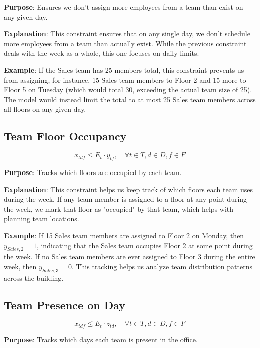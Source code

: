 \documentclass[12pt,a4paper]{article}
\begin{document}
\textbf{Purpose}: Ensures we don't assign more employees from a team than exist on any given day.

\textbf{Explanation}: This constraint ensures that on any single day, we don't schedule more employees from a team than actually exist. While the previous constraint deals with the week as a whole, this one focuses on daily limits.

\textbf{Example}: If the Sales team has 25 members total, this constraint prevents us from assigning, for instance, 15 Sales team members to Floor 2 and 15 more to Floor 5 on Tuesday (which would total 30, exceeding the actual team size of 25). The model would instead limit the total to at most 25 Sales team members across all floors on any given day.

\subsection{Team Floor Occupancy}

\begin{equation}
x_{tdf} \leq E_t \cdot y_{tf}, \quad \forall t \in T, d \in D, f \in F
\end{equation}

\textbf{Purpose}: Tracks which floors are occupied by each team.

\textbf{Explanation}: This constraint helps us keep track of which floors each team uses during the week. If any team member is assigned to a floor at any point during the week, we mark that floor as "occupied" by that team, which helps with planning team locations.

\textbf{Example}: If 15 Sales team members are assigned to Floor 2 on Monday, then $y_{Sales,2} = 1$, indicating that the Sales team occupies Floor 2 at some point during the week. If no Sales team members are ever assigned to Floor 3 during the entire week, then $y_{Sales,3} = 0$. This tracking helps us analyze team distribution patterns across the building.

\subsection{Team Presence on Day}

\begin{equation}
x_{tdf} \leq E_t \cdot z_{td}, \quad \forall t \in T, d \in D, f \in F
\end{equation}

\textbf{Purpose}: Tracks which days each team is present in the office.
\end{document}
